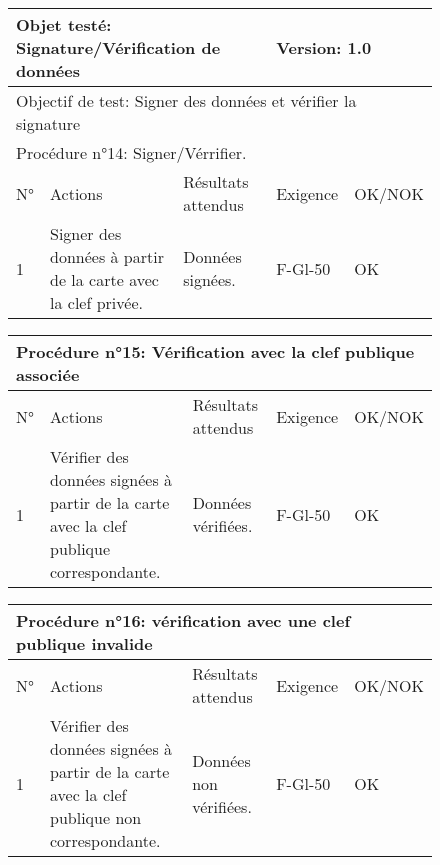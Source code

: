 \documentclass[a4paper,11pt,french]{article}
\begin{document}
\begin{figure}[!h]
\begin{tabular}{|p{1cm}|p{5cm}|p{5cm}|p{2cm}|p{2cm}|}
\hline
\multicolumn{3}{|l|}{Objet testé: Signature/Vérification de données} & \multicolumn{2}{|l|}{Version: 1.0} \\
\hline
\multicolumn{5}{|l|}{Objectif de test: Signer des données et vérifier la signature} \\
\hline
\multicolumn{5}{|l|}{Procédure n°14: Signer/Vérrifier.} \\
\hline
N° & Actions & Résultats attendus & Exigence & OK/NOK \\
\hline
1 & Signer des données à partir de la carte avec la clef privée. & Données signées. & F-Gl-50 & OK \\
\hline
\end{tabular}
\end{figure}


\begin{figure}[!h]
\begin{tabular}{|p{1cm}|p{5cm}|p{5cm}|p{2cm}|p{2cm}|}
\hline
\multicolumn{5}{|l|}{Procédure n°15: Vérification avec la clef publique associée} \\
\hline
N° & Actions & Résultats attendus & Exigence & OK/NOK \\
\hline
1 & Vérifier des données signées à partir de la carte avec la clef publique correspondante. & Données vérifiées. & F-Gl-50 & OK \\
\hline
\end{tabular}
\end{figure}


\begin{figure}[!h]
\begin{tabular}{|p{1cm}|p{5cm}|p{5cm}|p{2cm}|p{2cm}|}
\hline
\multicolumn{5}{|l|}{Procédure n°16: vérification avec une clef publique invalide} \\
\hline
N° & Actions & Résultats attendus & Exigence & OK/NOK \\
\hline
1 & Vérifier des données signées à partir de la carte avec la clef publique non correspondante. & Données non vérifiées. & F-Gl-50 & OK \\
\hline
\end{tabular}
\end{figure}
\end{document}
